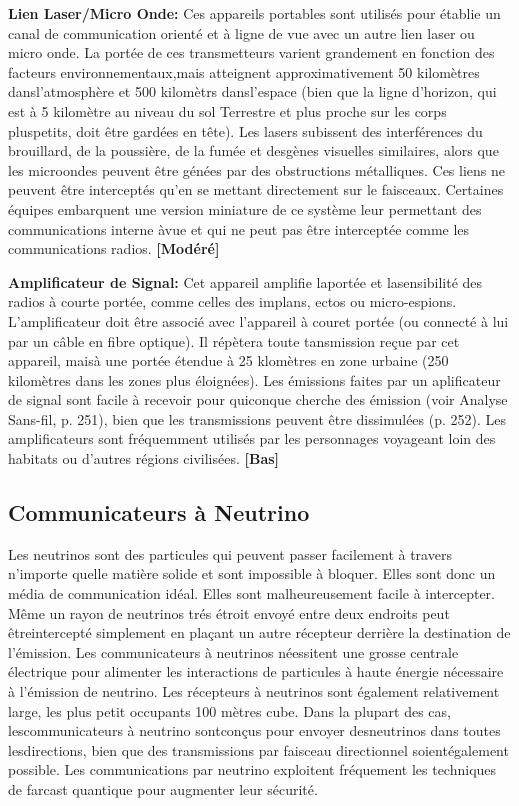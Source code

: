 \textbf{Lien Laser/Micro Onde:} Ces appareils portables sont utilisés pour établie un canal de communication orienté et à ligne de vue avec un autre lien laser ou micro onde. La portée de ces transmetteurs varient grandement en fonction des facteurs environnementaux,mais atteignent approximativement 50 kilomètres dansl'atmosphère et 500 kilomètrs dansl'espace (bien que la ligne d'horizon, qui est à 5 kilomètre au niveau du sol Terrestre et plus proche sur les corps pluspetits, doit être gardées en tête). Les lasers subissent des interférences du brouillard, de la poussière, de la fumée et desgènes visuelles similaires, alors que les microondes peuvent être génées par des obstructions métalliques. Ces liens ne peuvent être interceptés qu'en se mettant directement sur le faisceaux. Certaines équipes embarquent une version miniature de ce système leur permettant des communications interne àvue et qui ne peut pas être interceptée comme les communications radios. \textbf{[Modéré]} 

\textbf{Amplificateur de Signal:} Cet appareil amplifie laportée et lasensibilité des radios à courte portée, comme celles des implans, ectos ou micro-espions. L'amplificateur doit être associé avec l'appareil à couret portée (ou connecté à lui par un câble en fibre optique). Il répètera toute tansmission reçue par cet appareil, maisà une portée étendue à 25 klomètres en zone urbaine (250 kilomètres dans les zones plus éloignées). Les émissions faites par un aplificateur de signal sont facile à recevoir pour quiconque cherche des émission (voir Analyse Sans-fil, p. 251), bien que les transmissions peuvent être dissimulées (p. 252). Les amplificateurs sont fréquemment utilisés par les personnages voyageant loin des habitats ou d'autres régions civilisées. \textbf{[Bas]} 



\subsection{Communicateurs à Neutrino} \label{sec:neutrino-communicators} 

Les neutrinos sont des particules qui peuvent passer facilement à travers n'importe quelle matière solide et sont impossible à bloquer. Elles sont donc un média de communication idéal. Elles sont malheureusement facile à intercepter. Même un rayon de neutrinos trés étroit envoyé entre deux endroits peut êtreintercepté simplement en plaçant un autre récepteur derrière la destination de l'émission. Les communicateurs à neutrinos néessitent une grosse centrale électrique pour alimenter les interactions de particules à haute énergie nécessaire à l'émission de neutrino. Les récepteurs à neutrinos sont également relativement large, les plus petit occupants 100 mètres cube. Dans la plupart des cas, lescommunicateurs à neutrino sontconçus pour envoyer desneutrinos dans toutes lesdirections, bien que des transmissions par faisceau directionnel soientégalement possible. Les communications par neutrino exploitent fréquement les techniques de farcast quantique pour augmenter leur sécurité. 

